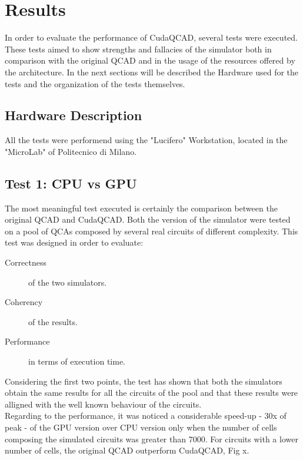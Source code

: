 \chapter{Results}\label{sec:results}
In order to evaluate the performance of CudaQCAD, several tests were executed. These tests aimed to show strengths and fallacies of the simulator both in comparison with the original QCAD and in the usage of the resources offered by the architecture. In the next sections will be described the Hardware used for the tests and the organization of the tests themselves.

\section{Hardware Description}
All the tests were performend using the "Lucifero" Workstation, located in the "MicroLab" of Politecnico di Milano. 

\section{Test 1: CPU vs GPU}
The most meaningful test executed is certainly the comparison between the original QCAD and CudaQCAD. Both the version of the simulator were tested on a pool of QCAs composed by several real circuits of different complexity. This test was designed in order to evaluate:

\begin{description}
\item[Correctness] of the two simulators.
\item[Coherency] of the results.
\item[Performance] in terms of execution time.
\end{description}    

Considering the first two points, the test has shown that both the simulators obtain the same results for all the circuits of the pool and that these results were alligned with the well known behaviour of the circuits.\\
Regarding to the performance, it was noticed a considerable speed-up - 30x of peak - of the GPU version over CPU version only when the number of cells composing the simulated circuits was greater than 7000. For circuits with a lower number of cells, the original QCAD outperform CudaQCAD, Fig x.
 
